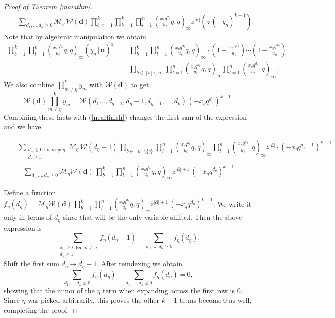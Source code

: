 \documentclass[12pt]{article}
\theoremstyle{plain}
\theoremstyle{definition}
\newcommand{\ub}{\boldsymbol{u}}
\begin{document}
\begin{proof}[Proof of Theorem \ref{mainthm}]
\begin{align}
&- \sum_{d_1,\dots,d_k \geq 0} \mathcal{M}_\eta\, \mathcal{W}(\boldsymbol{d})\prod_{b,c=1}^k  {\prod_{b=1} ^k \prod_{l=1}^n \left(\frac{x_b q^{d_b}}{u_\ell}q,q \right)_\infty}{z}^{|\boldsymbol{d}|}\left(z\, (-y_\eta )^{k-1}\right).
\end{align}
Note that by algebraic manipulation we obtain
\begin{align*}
\prod_{b=1} ^k \prod_{l=1}^n \left(\frac{x_b q^{d_b}}{u_\ell}q,q \right)_\infty(y_\eta \, | \, \ub)^{n}&=\prod_{b=1} ^k \prod_{l=1}^n \left(\frac{x_b q^{d_b}}{u_\ell}q,q \right)_\infty \cdot \left(1-\frac{x_\eta q^{d_\eta}}{u_1}\right)\cdots\left(1-\frac{x_\eta q^{d_\eta}}{u_n}\right)\\
&= \prod_{b\in [k]\setminus  \{\eta\}}  \prod_{l=1}^n \left(\frac{x_b q^{d_b}}{u_\ell}q,q \right)_\infty \prod_{l=1}^n \left(\frac{x_\eta q^{d_\eta}}{u_\ell},q \right)_\infty.
\end{align*}
We also combine $\prod_{m\neq \eta} ^k y_m$ with $\mathcal{W}(\boldsymbol{d})$ to get
$$\mathcal{W}(\boldsymbol{d})\prod_{m\neq \eta} ^k y_m = \mathcal{W}(d_1\dots, d_{\eta-1},d_\eta-1,d_{\eta+1},\dots,d_k) \, (-x_\eta q^{d_\eta})^{k-1}.
$$
Combining these facts with (\ref{nearfinish}) changes the first sum of the expression and we have

\begin{align*}
=&\sum_{\substack{d_m\geq 0 \text{ for } m\neq\eta \\d_\eta \geq 1}} \mathcal{M}_\eta \, \mathcal{W}(d_{\eta}-1)\, {\prod_{b\in [k]\setminus  \{\eta\}}  \prod_{l=1}^n \left(\frac{x_b q^{d_b}}{u_\ell}q,q \right)_\infty \prod_{l=1}^n \left(\frac{x_\eta q^{d_\eta}}{u_\ell},q \right)_\infty}{z}^{|\boldsymbol{d}|}  \cdot \left( -x_\eta q^{d_\eta-1} \right) ^{k-1}\\
&- \sum_{d_1,\dots,d_k \geq 0} \mathcal{M}_\eta\mathcal{W}(\boldsymbol{d})\, {\prod_{b=1} ^k \prod_{l=1}^n \left(\frac{x_b q^{d_b}}{u_\ell}q,q \right)_\infty}{z}^{|\boldsymbol{d}|+1}\, (-x_\eta q^{d_\eta})^{k-1}
\end{align*}

Define a function $f_\eta (d_\eta) =\mathcal{M}_\eta\mathcal{W}(\boldsymbol{d})\, {\prod_{b=1} ^k \prod_{l=1}^n \left(\frac{x_b q^{d_b}}{u_\ell}q,q \right)_\infty}{z}^{|\boldsymbol{d}|+1}\, (-x_\eta q^{d_\eta})^{k-1}$. We write it only in terms of $d_\eta$ since that will be the only variable shifted. Then the above expression is
\begin{equation*}
    \sum_{\substack{d_m\geq 0 \text{ for } m\neq\eta \\d_\eta \geq 1}} f_\eta (d_\eta-1) - \sum_{d_1,\dots,d_k \geq 0}  f_\eta(d_\eta).
\end{equation*}
Shift the first sum $d_\eta \to d_\eta+1$. After reindexing we obtain
\begin{equation*}
    \sum_{d_1,\dots,d_k \geq 0}  f_\eta(d_\eta)-\sum_{d_1,\dots,d_k \geq 0}  f_\eta(d_\eta)=0,
\end{equation*}
showing that the minor of the $\eta$ term when expanding across the first row is 0. Since $\eta$ was picked arbitrarily, this proves the other $k-1$ terms become 0 as well, completing the proof.
\end{proof}
\end{document}
